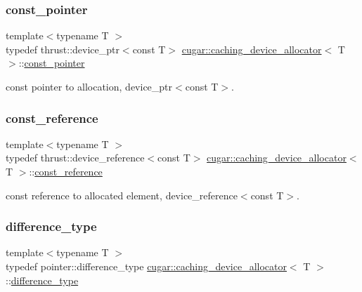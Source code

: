 \subsubsection{\texorpdfstring{const\+\_\+pointer}{const\_pointer}}
{\footnotesize\ttfamily template$<$typename T $>$ \\
typedef thrust\+::device\+\_\+ptr$<$const T$>$ \hyperlink{structcugar_1_1caching__device__allocator}{cugar\+::caching\+\_\+device\+\_\+allocator}$<$ T $>$\+::\hyperlink{structcugar_1_1caching__device__allocator_a56ae6e43547f283ab330befe1643e3dd}{const\+\_\+pointer}}

{\ttfamily const} pointer to allocation, {\ttfamily device\+\_\+ptr$<$const T$>$}. \mbox{\label{structcugar_1_1caching__device__allocator_a1c9ffc95bc3d45eb753113428c362aa6}} 
\subsubsection{\texorpdfstring{const\+\_\+reference}{const\_reference}}
{\footnotesize\ttfamily template$<$typename T $>$ \\
typedef thrust\+::device\+\_\+reference$<$const T$>$ \hyperlink{structcugar_1_1caching__device__allocator}{cugar\+::caching\+\_\+device\+\_\+allocator}$<$ T $>$\+::\hyperlink{structcugar_1_1caching__device__allocator_a1c9ffc95bc3d45eb753113428c362aa6}{const\+\_\+reference}}

{\ttfamily const} reference to allocated element, {\ttfamily device\+\_\+reference$<$const T$>$}. \mbox{\label{structcugar_1_1caching__device__allocator_ae3b6337c894bc9a1bb8bf056593ceb4e}} 
\subsubsection{\texorpdfstring{difference\+\_\+type}{difference\_type}}
{\footnotesize\ttfamily template$<$typename T $>$ \\
typedef pointer\+::difference\+\_\+type \hyperlink{structcugar_1_1caching__device__allocator}{cugar\+::caching\+\_\+device\+\_\+allocator}$<$ T $>$\+::\hyperlink{structcugar_1_1caching__device__allocator_ae3b6337c894bc9a1bb8bf056593ceb4e}{difference\+\_\+type}}

